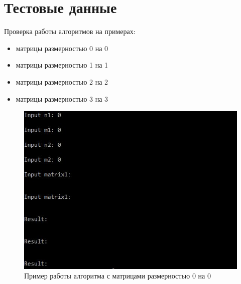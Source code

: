 \documentclass[12pt]{report}
\begin{document}
\section{Тестовые данные}

Проверка работы алгоритмов на примерах:
\begin{itemize}
	\item матрицы размерностью 0 на 0
	\item матрицы размерностью 1 на 1
	\item матрицы размерностью 2 на 2
	\item матрицы размерностью 3 на 3
\end{itemize}

\begin{figure}[h]
\centering
\includegraphics[width=1\linewidth]{matrix00.jpg}
\caption{Пример работы алгоритма с матрицами размерностью 0 на 0}
\label{fig:mpr}
\end{figure}
\end{document}
